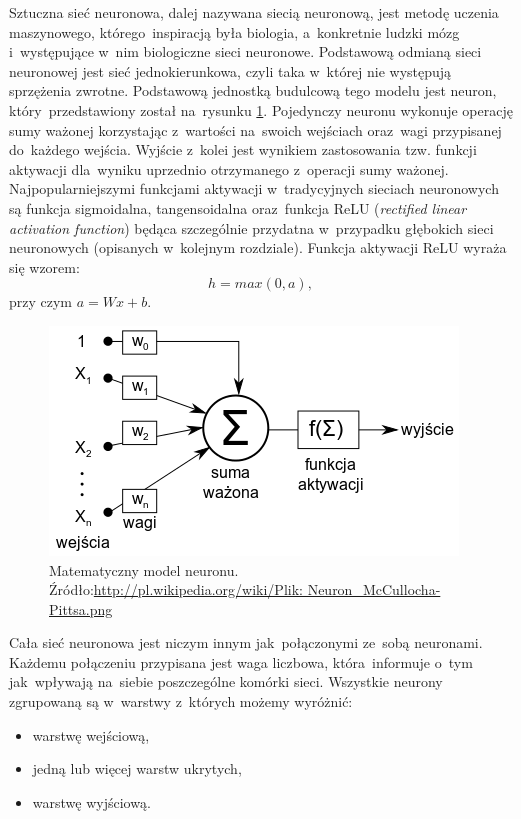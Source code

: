Sztuczna sieć neuronowa, dalej nazywana siecią neuronową, jest metodę uczenia maszynowego, którego~inspiracją była biologia, a~konkretnie ludzki mózg i~występujące w~nim biologiczne sieci neuronowe. Podstawową odmianą sieci neuronowej jest sieć jednokierunkowa, czyli taka w~której nie występują sprzężenia zwrotne. Podstawową jednostką budulcową tego modelu jest neuron, który~przedstawiony został na~rysunku \ref{neuron}. Pojedynczy neuronu wykonuje operację sumy ważonej korzystając z~wartości na~swoich wejściach oraz~wagi przypisanej do~każdego wejścia. Wyjście z~kolei jest wynikiem zastosowania tzw. funkcji aktywacji dla~wyniku uprzednio otrzymanego z~operacji sumy ważonej. Najpopularniejszymi funkcjami aktywacji w~tradycyjnych sieciach neuronowych są funkcja sigmoidalna, tangensoidalna oraz~funkcja ReLU (\textit{rectified linear activation function}) będąca szczególnie przydatna w~przypadku głębokich sieci neuronowych (opisanych w~kolejnym rozdziale). Funkcja aktywacji ReLU wyraża się wzorem:
\begin{equation}
h=max(0,a),
\end{equation}
 przy czym $a=Wx+b$.
 
\begin{figure}[ht!]
\centering
\includegraphics{res/neuron.png}
\caption[Caption for LOF]{Matematyczny model neuronu. Źródło:\url{http://pl.wikipedia.org/wiki/Plik:
Neuron_McCullocha-Pittsa.png}\label{neuron}}
\end{figure} 

\noindent
Cała sieć neuronowa jest niczym innym jak~połączonymi ze~sobą neuronami. Każdemu połączeniu przypisana jest waga liczbowa, która~informuje o~tym jak~wpływają na~siebie poszczególne komórki sieci. Wszystkie neurony zgrupowaną są w~warstwy z~których możemy wyróżnić:
\begin{itemize}
\item warstwę wejściową,
\item jedną lub więcej warstw ukrytych,
\item warstwę wyjściową.
\end{itemize}

